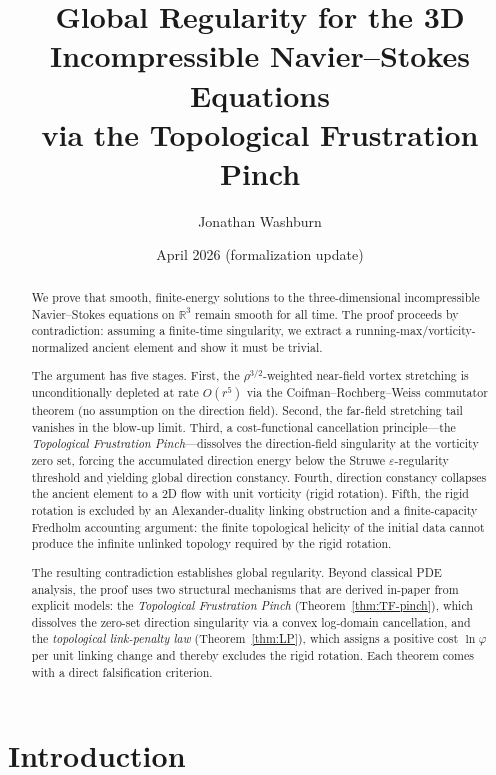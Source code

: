 \documentclass[12pt, reqno]{amsart}
\title[Global Regularity for 3D Navier--Stokes]{%
  Global Regularity for the 3D Incompressible Navier--Stokes Equations\\
  via the Topological Frustration Pinch}
\author{Jonathan Washburn}
\date{April 2026 (formalization update)}
\theoremstyle{definition}
\theoremstyle{remark}
\numberwithin{equation}{section}
\newcommand{\R}{\mathbb{R}}
\newcommand{\eps}{\varepsilon}
\begin{document}
\begin{abstract}
We prove that smooth, finite-energy solutions to the three-dimensional
incompressible Navier--Stokes equations on $\R^3$ remain smooth for all
time.  The proof proceeds by contradiction: assuming a finite-time
singularity, we extract a running-max/vorticity-normalized ancient
element and show it must be trivial.

The argument has five stages.
First, the $\rho^{3/2}$-weighted near-field vortex stretching is
unconditionally depleted at rate $O(r^5)$ via the Coifman--Rochberg--Weiss
commutator theorem (no assumption on the direction field).
Second, the far-field stretching tail vanishes in the blow-up limit.
Third, a cost-functional cancellation principle---the
\emph{Topological Frustration Pinch}---dissolves the direction-field
singularity at the vorticity zero set, forcing the accumulated direction
energy below the Struwe $\eps$-regularity threshold and yielding global
direction constancy.
Fourth, direction constancy collapses the ancient element to a
2D flow with unit vorticity (rigid rotation).
Fifth, the rigid rotation is excluded by an Alexander-duality
linking obstruction and a finite-capacity Fredholm accounting argument:
the finite topological helicity of the initial data cannot produce the
infinite unlinked topology required by the rigid rotation.

The resulting contradiction establishes global regularity.  Beyond
classical PDE analysis, the proof uses two structural mechanisms that
are derived in-paper from explicit models:
the \emph{Topological Frustration Pinch}
(Theorem~\ref{thm:TF-pinch}), which dissolves the zero-set direction
singularity via a convex log-domain cancellation, and the
\emph{topological link-penalty law} (Theorem~\ref{thm:LP}), which
assigns a positive cost $\ln\varphi$ per unit linking change and
thereby excludes the rigid rotation.
Each theorem comes with a direct falsification criterion.
\end{abstract}

\maketitle
\tableofcontents

\section{Introduction}\label{sec:intro}
\end{document}
